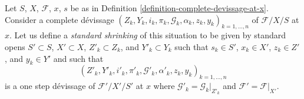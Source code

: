 \begin{definition}
\label{definition-shrink-complete}
Let $S$, $X$, $\mathcal{F}$, $x$, $s$ be as in
Definition \ref{definition-complete-devissage-at-x}.
Consider a complete d\'evissage
$(Z_k, Y_k, i_k, \pi_k, \mathcal{G}_k, \alpha_k, z_k, y_k)_{k = 1, \ldots, n}$
of $\mathcal{F}/X/S$ at $x$. Let us define a
{\it standard shrinking} of this situation to be
given by standard opens $S' \subset S$, $X' \subset X$,
$Z'_k \subset Z_k$, and $Y'_k \subset Y_k$ such that $s_k \in S'$,
$x_k \in X'$, $z_k \in Z'$, and $y_k \in Y'$ and such that
$$
(Z'_k, Y'_k, i'_k, \pi'_k,
\mathcal{G}'_k, \alpha'_k, z_k, y_k)_{k = 1, \ldots, n}
$$
is a one step d\'evissage of $\mathcal{F}'/X'/S'$ at $x$ where
$\mathcal{G}'_k = \mathcal{G}_k|_{Z'_k}$ and
$\mathcal{F}' = \mathcal{F}|_{X'}$.
\end{definition}